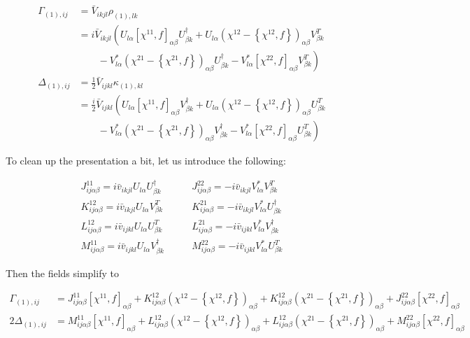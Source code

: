 \begin{align*}
\Gamma_{(1),ij} &= \bar{V}_{ikjl}\rho_{(1),lk} \\
&= i\bar{V}_{ikjl}\left(U_{l\alpha}[\chi^{11},f]_{\alpha\beta}U^\dagger_{\beta k} + U_{l\alpha}\left(\chi^{12}-\left\{\chi^{12},f\right\}\right)_{\alpha\beta}V^T_{\beta k}\right. \\
&\left.\qquad - V^*_{l\alpha}\left(\chi^{21}-\left\{\chi^{21},f\right\}\right)_{\alpha\beta}U^\dagger_{\beta k} - V^*_{l\alpha}[\chi^{22},f]_{\alpha\beta}V^T_{\beta k} \right) \\
\Delta_{(1),ij} &= \frac{1}{2}\bar{V}_{ijkl}\kappa_{(1),kl} \\
&= \frac{i}{2}\bar{V}_{ijkl}\left(U_{l\alpha}[\chi^{11},f]_{\alpha\beta}V^\dagger_{\beta k} + U_{l\alpha}\left(\chi^{12}-\left\{\chi^{12},f\right\}\right)_{\alpha\beta}U^T_{\beta k}\right. \\
&\left.\qquad - V^*_{l\alpha}\left(\chi^{21}-\left\{\chi^{21},f\right\}\right)_{\alpha\beta}V^\dagger_{\beta k} - V^*_{l\alpha}[\chi^{22},f]_{\alpha\beta}U^T_{\beta k} \right)
\end{align*}

To clean up the presentation a bit, let us introduce the following:

\begin{tcolorbox}
\begin{align*}
J^{11}_{ij\alpha\beta} = i\bar{v}_{ikjl}U_{l\alpha}U^\dagger_{\beta k} &\qquad J^{22}_{ij\alpha\beta} = -i\bar{v}_{ikjl}V^*_{l\alpha}V^T_{\beta k} \\
K^{12}_{ij\alpha\beta} = i\bar{v}_{ikjl}U_{l\alpha}V^T_{\beta k} &\qquad K^{21}_{ij\alpha\beta} = -i\bar{v}_{ikjl}V^*_{l\alpha}U^\dagger_{\beta k} \\
L^{12}_{ij\alpha\beta} = i\bar{v}_{ijkl}U_{l\alpha}U^T_{\beta k} &\qquad L^{21}_{ij\alpha\beta} = -i\bar{v}_{ijkl}V^*_{l\alpha}V^\dagger_{\beta k} \\
M^{11}_{ij\alpha\beta} = i\bar{v}_{ijkl}U_{l\alpha}V^\dagger_{\beta k} &\qquad M^{22}_{ij\alpha\beta} = -i\bar{v}_{ijkl}V^*_{l\alpha}U^T_{\beta k}
\end{align*}
\end{tcolorbox}

\noindent Then the fields simplify to

\begin{align*}
\Gamma_{(1),ij} &= J^{11}_{ij\alpha\beta}[\chi^{11},f]_{\alpha\beta} + K^{12}_{ij\alpha\beta}\left(\chi^{12}-\left\{\chi^{12},f\right\}\right)_{\alpha\beta} + K^{12}_{ij\alpha\beta}\left(\chi^{21}-\left\{\chi^{21},f\right\}\right)_{\alpha\beta} + J^{22}_{ij\alpha\beta}[\chi^{22},f]_{\alpha\beta} \\
2\Delta_{(1),ij}  &= M^{11}_{ij\alpha\beta}[\chi^{11},f]_{\alpha\beta} + L^{12}_{ij\alpha\beta}\left(\chi^{12}-\left\{\chi^{12},f\right\}\right)_{\alpha\beta} + L^{12}_{ij\alpha\beta}\left(\chi^{21}-\left\{\chi^{21},f\right\}\right)_{\alpha\beta} + M^{22}_{ij\alpha\beta}[\chi^{22},f]_{\alpha\beta} \\
\end{align*}

